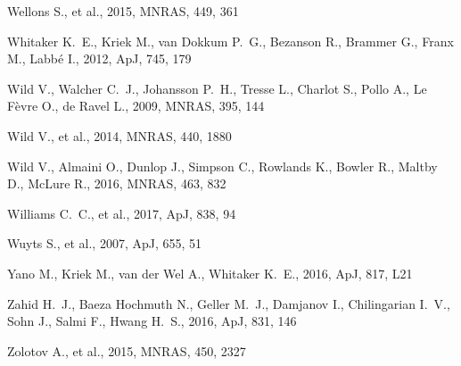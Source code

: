 \documentclass[a4paper,fleqn,usenatbib,useAMS]{mnras}
\begin{document}
\begin{thebibliography}{}
 Wellons S., et al., 2015, MNRAS, 449, 361 


 Whitaker K.~E., Kriek M., van Dokkum 
P.~G., Bezanson R., Brammer G., Franx M., Labb{\'e} I., 2012, ApJ, 745, 179 


Wild V., Walcher C.~J., Johansson P.~H., Tresse L., Charlot S., Pollo A., 
Le F{\`e}vre O., de Ravel L., 2009, MNRAS, 395, 144 



Wild V., et al., 2014, MNRAS, 440, 1880 




 Wild V., Almaini O., Dunlop J., Simpson C., Rowlands K., Bowler R., Maltby D., McLure R., 2016, MNRAS, 463, 832 



 Williams C.~C., et al., 2017, ApJ, 838, 94 




Wuyts S., et al., 2007, ApJ, 655, 51 


 Yano M., Kriek M., van der Wel A., Whitaker K.~E., 2016, ApJ, 817, L21 


 Zahid H.~J., Baeza Hochmuth N., Geller M.~J., Damjanov I., Chilingarian I.~V., Sohn J., Salmi F., Hwang H.~S., 2016, ApJ, 831, 146 



 Zolotov A., et al., 2015, MNRAS, 450, 2327 





\end{thebibliography}



\end{document}
